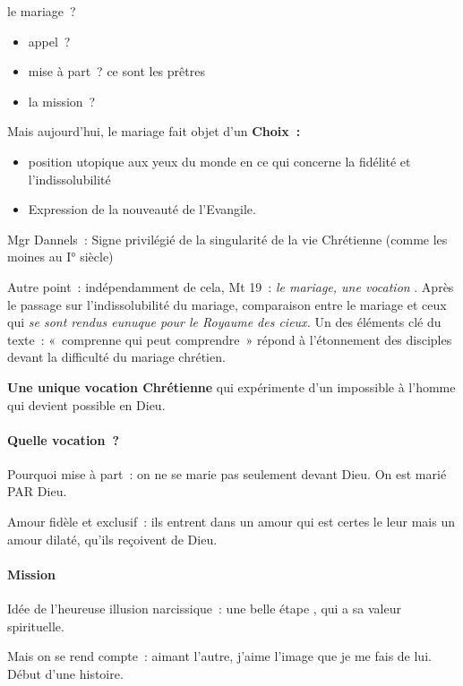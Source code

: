 le mariage~?

\begin{itemize}
\item
  appel~?
\item
  mise à part~? ce sont les prêtres
\item
  la mission~?
\end{itemize}

Mais aujourd'hui, le mariage fait objet d'un \textbf{Choix~:}

\begin{itemize}
\item
  position utopique aux yeux du monde en ce qui concerne la fidélité et
  l'indissolubilité
\item
  Expression de la nouveauté de l'Evangile.
\end{itemize}

Mgr Dannels~: Signe privilégié de la singularité de la vie Chrétienne
(comme les moines au I° siècle)

Autre point~: indépendamment de cela, Mt 19~: \emph{le mariage, une
vocation} . Après le passage sur l'indissolubilité du mariage,
comparaison entre le mariage et ceux qui \emph{se sont rendus eunuque
pour le Royaume des cieux.} Un des éléments clé du texte~: «~comprenne
qui peut comprendre~» répond à l'étonnement des disciples devant la
difficulté du mariage chrétien.

\textbf{Une unique vocation Chrétienne} qui expérimente d'un impossible
à l'homme qui devient possible en Dieu.

\hypertarget{quelle-vocation}{%
\paragraph{Quelle vocation~?}\label{quelle-vocation}}

Pourquoi mise à part~: on ne se marie pas seulement devant Dieu. On est
marié PAR Dieu.

Amour fidèle et exclusif~: ils entrent dans un amour qui est certes le
leur mais un amour dilaté, qu'ils reçoivent de Dieu.

\hypertarget{mission}{%
\paragraph{Mission}\label{mission}}

Idée de l'heureuse illusion narcissique~: une belle étape , qui a sa
valeur spirituelle.

Mais on se rend compte~: aimant l'autre, j'aime l'image que je me fais
de lui. Début d'une histoire.

